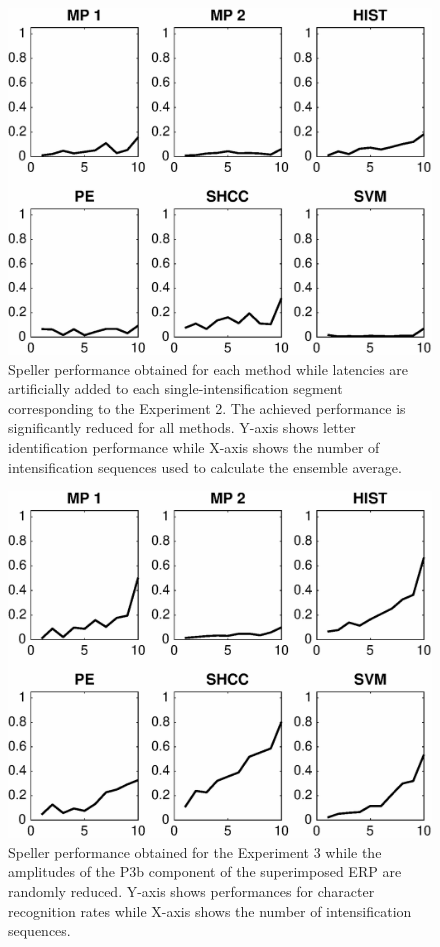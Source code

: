 \begin{figure}[h!]
\centering
\includegraphics[width=15cm]{images/CrossPerformanceTestLatency.eps}
\caption[Experiment II Pseudo-real Dataset III Speller Performance]{Speller performance obtained for each method while latencies are artificially added to each single-intensification segment corresponding to the Experiment 2.  The achieved performance is significantly reduced for all methods. Y-axis shows letter identification performance while X-axis shows the number of intensification sequences used to calculate the ensemble average.}
\label{fig:performancetestlatency}
\end{figure}

\begin{figure}[h!]
\centering
\includegraphics[width=15cm]{images/CrossPerformanceTestAmplitude.eps}
\caption[Experiment III Pseudo-real Dataset III Speller Performance]{Speller performance obtained for the Experiment 3 while the amplitudes of the P3b component of the superimposed ERP are randomly reduced. Y-axis shows performances for character recognition rates while X-axis shows the number of intensification sequences.}
\label{fig:performancetestamplitude}
\end{figure}

